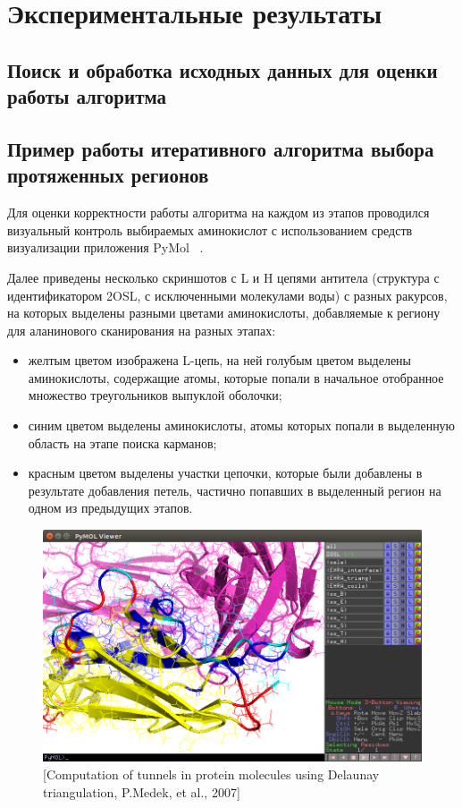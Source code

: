 \graphicspath{{../images/algorithm/}}
\chapter{Экспериментальные результаты}
\section{Поиск и обработка исходных данных для оценки работы алгоритма}
\cite{asedb2001}

\cite{kortemme_alascan_datasets}
\cite{sdr1}
\section{Пример работы итеративного алгоритма выбора протяженных регионов}
Для оценки корректности работы алгоритма на каждом из этапов проводился визуальный контроль выбираемых аминокислот с использованием средств визуализации приложения PyMol ~\cite{pymol}.

Далее приведены несколько скриншотов с L и H цепями антитела (структура с идентификатором 2OSL, с исключенными молекулами воды) с разных ракурсов, на которых выделены разными цветами аминокислоты, добавляемые к региону для аланинового сканирования на разных этапах:
\begin{itemize}

\item желтым цветом изображена L-цепь, на ней голубым цветом выделены аминокислоты, содержащие атомы, которые попали в начальное отобранное множество треугольников выпуклой оболочки;

\item синим цветом выделены аминокислоты, атомы которых попали в выделенную область на этапе поиска карманов;

\item красным цветом выделены участки цепочки, которые были добавлены в результате добавления петель, частично попавших в выделенный регион на одном из предыдущих этапов.
\end{itemize}

\begin{figure}
\includegraphics[width=\linewidth]{loops1.png}

\caption{\small{[Computation of tunnels in protein molecules using
Delaunay triangulation, P.Medek, et al., 2007]
 }}
\label{fig:loops1}
\end{figure}


